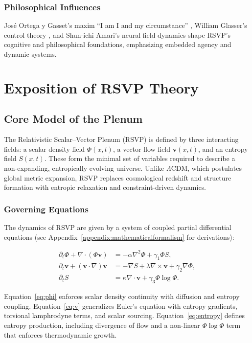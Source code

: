 \documentclass[12pt]{report}
\begin{document}
\section{Philosophical Influences}
José Ortega y Gasset’s maxim “I am I and my circumstance” \citep{Ortega1914}, William Glasser’s control theory \citep{Glasser1985}, and Shun-ichi Amari’s neural field dynamics \citep{Amari1977} shape RSVP’s cognitive and philosophical foundations, emphasizing embedded agency and dynamic systems.

\part{Exposition of RSVP Theory}

\chapter{Core Model of the Plenum}

The Relativistic Scalar--Vector Plenum (RSVP) is defined by three interacting fields: a scalar density field $\Phi(x,t)$, a vector flow field $\mathbf{v}(x,t)$, and an entropy field $S(x,t)$. These form the minimal set of variables required to describe a non-expanding, entropically evolving universe. Unlike $\Lambda$CDM, which postulates global metric expansion, RSVP replaces cosmological redshift and structure formation with entropic relaxation and constraint-driven dynamics.

\section{Governing Equations}

The dynamics of RSVP are given by a system of coupled partial differential equations (see Appendix~\ref{appendix:mathematicalformalism} for derivations):

\begin{align}
\partial_t \Phi + \nabla \cdot (\Phi \mathbf{v}) &= -\alpha \nabla^2 \Phi + \gamma_1 \Phi S, \label{eq:phi}\\
\partial_t \mathbf{v} + (\mathbf{v}\cdot\nabla)\mathbf{v} &= -\nabla S + \lambda \nabla \times \mathbf{v} + \gamma_2 \nabla \Phi, \label{eq:v}\\
\partial_t S &= \kappa \nabla \cdot \mathbf{v} + \gamma_3 \Phi \log \Phi. \label{eq:entropy}
\end{align}

Equation~\eqref{eq:phi} enforces scalar density continuity with diffusion and entropy coupling.  
Equation~\eqref{eq:v} generalizes Euler’s equation with entropy gradients, torsional lamphrodyne terms, and scalar sourcing.  
Equation~\eqref{eq:entropy} defines entropy production, including divergence of flow and a non-linear $\Phi\log\Phi$ term that enforces thermodynamic growth.
\end{document}
